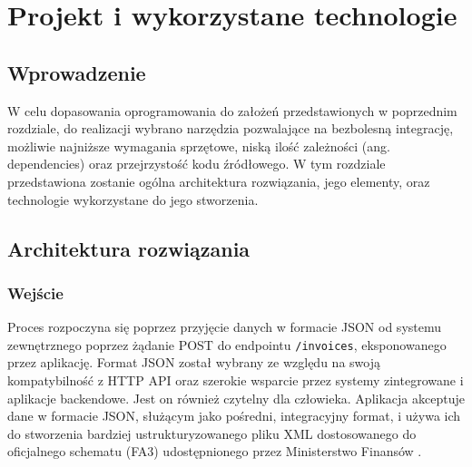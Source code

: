 \chapter{Projekt i wykorzystane technologie}
\section{Wprowadzenie}
W celu dopasowania oprogramowania do założeń przedstawionych w poprzednim rozdziale, do realizacji wybrano narzędzia pozwalające na bezbolesną integrację, możliwie najniższe wymagania sprzętowe, niską ilość zależności (ang. dependencies) oraz przejrzystość kodu źródłowego. W tym rozdziale przedstawiona zostanie ogólna architektura rozwiązania, jego elementy, oraz technologie wykorzystane do jego stworzenia.

\section{Architektura rozwiązania}
\subsection{Wejście}
Proces rozpoczyna się poprzez przyjęcie danych w formacie JSON %
od systemu zewnętrznego poprzez żądanie POST %
do endpointu \texttt{/invoices}, eksponowanego przez aplikację. 
Format JSON został wybrany ze względu na swoją kompatybilność z HTTP API oraz szerokie wsparcie przez systemy zintegrowane i aplikacje backendowe. Jest on również czytelny dla człowieka. Aplikacja akceptuje dane w formacie JSON, służącym jako pośredni, integracyjny format, i używa ich do stworzenia bardziej ustrukturyzowanego pliku XML dostosowanego do oficjalnego schematu (FA3) udostępnionego przez Ministerstwo Finansów
.

